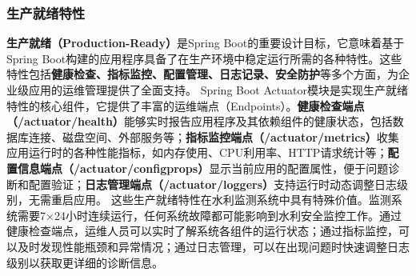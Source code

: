 \subsubsection{生产就绪特性}\label{ux751fux4ea7ux5c31ux7eeaux7279ux6027} \textbf{生产就绪（Production-Ready）}是Spring
Boot的重要设计目标，它意味着基于Spring
Boot构建的应用程序具备了在生产环境中稳定运行所需的各种特性。这些特性包括\textbf{健康检查、指标监控、配置管理、日志记录、安全防护}等多个方面，为企业级应用的运维管理提供了全面支持。 Spring Boot
Actuator模块是实现生产就绪特性的核心组件，它提供了丰富的运维端点（Endpoints）。\textbf{健康检查端点（/actuator/health）}能够实时报告应用程序及其依赖组件的健康状态，包括数据库连接、磁盘空间、外部服务等；\textbf{指标监控端点（/actuator/metrics）}收集应用运行时的各种性能指标，如内存使用、CPU利用率、HTTP请求统计等；\textbf{配置信息端点（/actuator/configprops）}显示当前应用的配置属性，便于问题诊断和配置验证；\textbf{日志管理端点（/actuator/loggers）}支持运行时动态调整日志级别，无需重启应用。
这些生产就绪特性在水利监测系统中具有特殊价值。监测系统需要7×24小时连续运行，任何系统故障都可能影响到水利安全监控工作。通过健康检查端点，运维人员可以实时了解系统各组件的运行状态；通过指标监控，可以及时发现性能瓶颈和异常情况；通过日志管理，可以在出现问题时快速调整日志级别以获取更详细的诊断信息。
